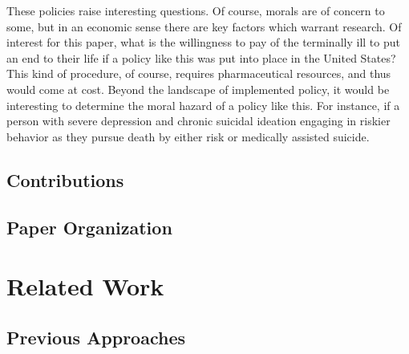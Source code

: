 \documentclass[11pt,a4paper]{article}
\begin{document}
These policies raise interesting questions. Of course, morals are of concern to some, but in an economic sense there are key factors which warrant research. Of interest for this paper,
what is the willingness to pay of the terminally ill to put an end to their life if a policy like this was put into place in the United States? This kind of procedure, of course, requires
pharmaceutical resources, and thus would come at cost. Beyond the landscape of implemented policy, it would be interesting to determine the moral hazard of a policy like this. For instance,
if a person with severe depression and chronic suicidal ideation engaging in riskier behavior as they pursue death by either risk or medically assisted suicide.

\subsection{Contributions}
\label{subsec:contributions}


\subsection{Paper Organization}
\label{subsec:organization}


\section{Related Work}
\label{sec:related_work}


\subsection{Previous Approaches}
\label{subsec:previous_approaches}

\end{document}

